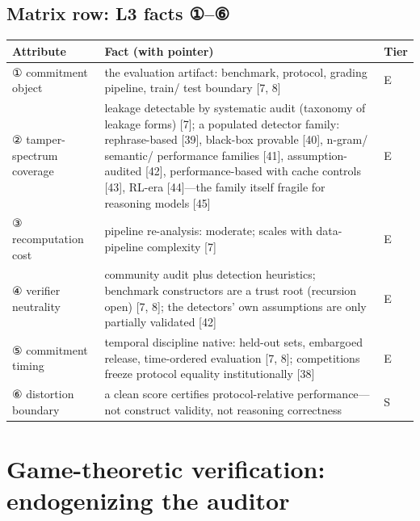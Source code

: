 \documentclass[11pt]{article}
\begin{document}
\subsection{Matrix row: L3 facts ①–⑥}
\begingroup\footnotesize
\noindent\begin{tabularx}{\textwidth}{@{}>{\raggedright\arraybackslash}p{} >{\raggedright\arraybackslash}X >{\raggedright\arraybackslash}p{}@{}}
\toprule
\textbf{\textbf{Attribute}} & \textbf{\textbf{Fact (with pointer)}} & \textbf{\textbf{Tier}} \\
\midrule
① commitment object & the evaluation artifact: benchmark, protocol, grading pipeline, train/ test boundary [7, 8] & E \\
② tamper-spectrum coverage & leakage detectable by systematic audit (taxonomy of leakage forms) [7]; a populated detector family: rephrase-based [39], black-box provable [40], n-gram/ semantic/ performance families [41], assumption-audited [42], performance-based with cache controls [43], RL-era [44]—the family itself fragile for reasoning models [45] & E \\
③ recomputation cost & pipeline re-analysis: moderate; scales with data-pipeline complexity [7] & E \\
④ verifier neutrality & community audit plus detection heuristics; benchmark constructors are a trust root (recursion open) [7, 8]; the detectors' own assumptions are only partially validated [42] & E \\
⑤ commitment timing & temporal discipline native: held-out sets, embargoed release, time-ordered evaluation [7, 8]; competitions freeze protocol equality institutionally [38] & E \\
⑥ distortion boundary & a clean score certifies protocol-relative performance—not construct validity, not reasoning correctness & S \\
\bottomrule
\end{tabularx}
\endgroup
\section{Game-theoretic verification: endogenizing the auditor}
\label{sec:7}
\end{document}
